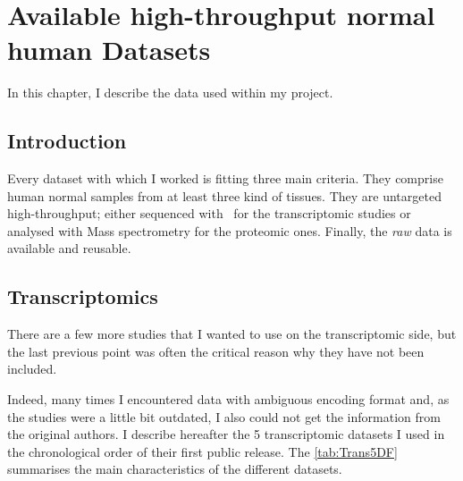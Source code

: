 \chapter{Available high-throughput normal human Datasets}
\label{ch:datasets}

\begin{comment}
\setlength{\epigraphwidth}{0.57\textwidth}
\setlength{\epigraphrule}{0.1pt}
\epigraph{Data! Data! Data! I can’t make bricks without clay!}{Sherlock Homes
    (Sir Arthur Conan Doyle)}
\end{comment}

In this chapter, I describe the data used within my project.

\section{Introduction}

Every dataset with which I worked is fitting three main criteria.
They comprise human normal samples from at least three kind of tissues.
They are untargeted high-throughput; either sequenced with \Rnaseq\
for the transcriptomic studies or
analysed with Mass spectrometry for the proteomic ones.
Finally, the \emph{raw} data is available and reusable.


\section{Transcriptomics}

There are a few more studies that I wanted to use on the
transcriptomic side, but the last previous point was often the critical reason
why they have not been included.

Indeed, many times I encountered data with ambiguous encoding format and, as the
studies were a little bit outdated,
I also could not get the information from the original authors.
I describe hereafter the 5 transcriptomic datasets I used
in the chronological order of their first public release.
The \cref{tab:Trans5DF} summarises the main characteristics of the different
datasets.

